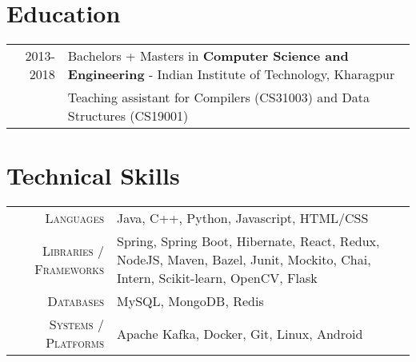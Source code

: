 \documentclass[a4paper,10pt]{extarticle} %
\begin{document}
\vspace{0.1cm}
\section{\textcolor{primary}{Education}}

\begin{tabular}{r|p{17.5cm}}	
\textsc{2013-2018} & Bachelors + Masters in \textbf{Computer Science and Engineering} - Indian Institute of Technology, Kharagpur\\
&Teaching assistant for Compilers (CS31003) and Data Structures (CS19001)\\
\end{tabular}


\vspace{0.1cm}
\section{\textcolor{primary}{Technical Skills}}

\begin{tabular}{r|p{15cm}}
\textsc{Languages} & Java, C++, Python, Javascript, HTML/CSS\\
\textsc{Libraries / Frameworks} & Spring, Spring Boot, Hibernate, React, Redux, NodeJS, Maven, Bazel, Junit, Mockito, Chai, Intern, Scikit-learn, OpenCV, Flask\\
\textsc{Databases} & MySQL, MongoDB, Redis\\
\textsc{Systems / Platforms} & Apache Kafka, Docker, Git, Linux, Android\\
\end{tabular}


\end{document}
